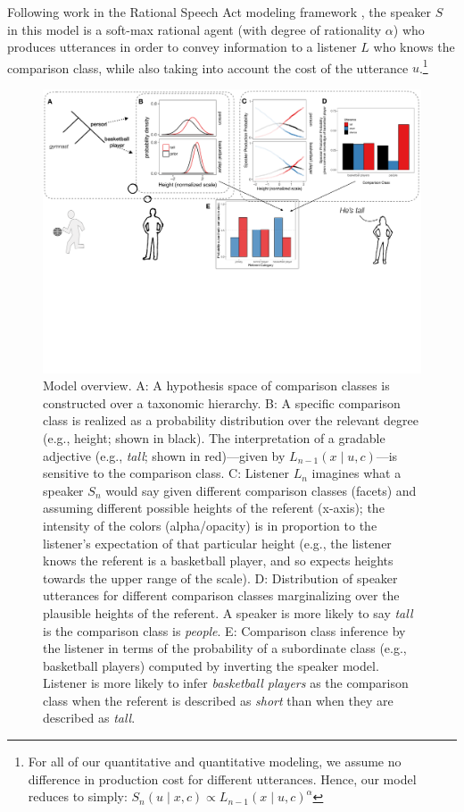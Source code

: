 \documentclass[doc]{apa6}
\begin{document}
Following work in the Rational Speech Act modeling framework \cite{Frank2012, Goodman2016, scontras2017probabilistic}, the speaker $S$ in this model is a soft-max rational agent (with degree of rationality $\alpha$) who produces utterances in order to convey information to a listener $L$ who knows the comparison class, while also taking into account the cost of the utterance $u$.\footnote{For all of our quantitative and quantitative modeling, we assume no difference in production cost for different utterances. Hence, our model reduces to simply: $S_n(u \mid x, c) \propto L_{n-1}(x \mid u, c)^{ \alpha}$}


\begin{figure}
\centering
\includegraphics[width=\textwidth]{figs/model_cartoon.pdf}
\caption{\label{fig:modelCartoon}Model overview. A: A hypothesis space of comparison classes is constructed over a taxonomic hierarchy. B: A specific comparison class is realized as a probability distribution over the relevant degree (e.g., height; shown in black). The interpretation of a gradable adjective (e.g., \emph{tall}; shown in red)---given by $L_{n-1}(x \mid u, c)$---is sensitive to the comparison class. C: Listener $L_n$ imagines what a speaker $S_n$ would say given different comparison classes (facets) and assuming different possible heights of the referent (x-axis); the intensity of the colors (alpha/opacity) is in proportion to the listener's expectation of that particular height (e.g., the listener knows the referent is a basketball player, and so expects heights towards the upper range of the scale). D: Distribution of speaker utterances for different comparison classes marginalizing over the plausible heights of the referent. A speaker is more likely to say \emph{tall} is the comparison class is \emph{people}. E: Comparison class inference by the listener in terms of the probability of a subordinate class (e.g., basketball players) computed by inverting the speaker model. Listener is more likely to infer \emph{basketball players} as the comparison class when the referent is described as \emph{short} than when they are described as \emph{tall}.
}
\end{figure}
\end{document}
